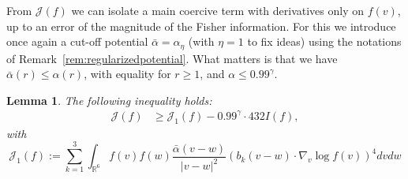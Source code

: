 \documentclass[11pt,a4paper]{article}
\theoremstyle{definition}
\theoremstyle{plain}
\newtheorem{lemma}[defi]{Lemma}
\begin{document}
From $\mathcal{J}(f)$ we can isolate a main coercive term with derivatives only on $f(v)$, up to an error of the magnitude of the Fisher information. For this we introduce once again a cut-off potential $\bar{\alpha}=\alpha_\eta$ (with $\eta=1$ to fix ideas) using the notations of Remark~\ref{rem:regularizedpotential}. What matters is that we have $\bar{\alpha}(r)\leq \alpha(r)$, with equality for $r\geq 1$, and $\alpha \leq 0.99^\gamma$.
\begin{lemma}
    \label{lem:Jcoerciveerrorcut}
    The following inequality holds:
    \begin{align}
        \label{eq:Jcoerciveerrorcut}
        \mathcal{J}(f)
    &\geq \mathcal{J}_1(f)
    -0.99^{\gamma}\cdot 432 I(f),
    \end{align}
    with
    $$ \mathcal{J}_1(f):=\sum_{k=1}^3\int_{\mathbb{R}^{6}}f(v)f(w)  \frac{\bar{\alpha}(v - w)}{\vert v - w\vert^2} \left( b_k(v-w)\cdot \nabla_v\log f(v) \right)^4 dvdw$$
\end{lemma}
\end{document}
